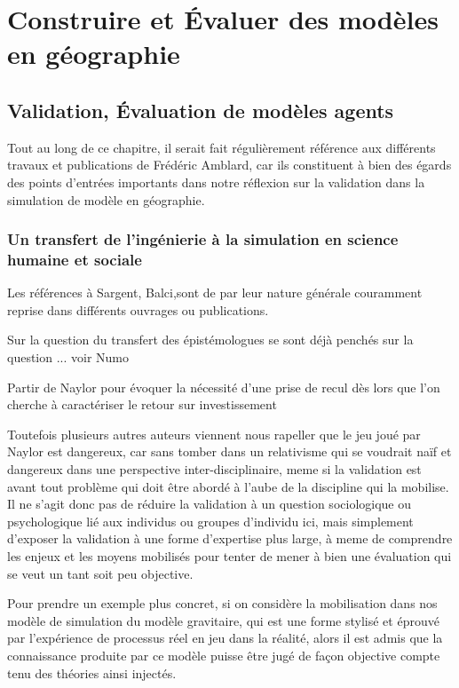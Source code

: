
\graphicspath{{Figure1/}}

\chapter{Construire et Évaluer des modèles en géographie}

\startcontents[chapters]
\Mprintcontents

\section {Validation, Évaluation de modèles agents} 

Tout au long de ce chapitre, il serait fait régulièrement référence aux différents travaux et publications de Frédéric Amblard, car ils constituent à bien des égards des points d'entrées importants dans notre réflexion sur la validation dans la simulation de modèle en géographie.

\subsection{Un transfert de l'ingénierie à la simulation en science humaine et sociale}

Les références à Sargent, Balci,sont de par leur nature générale couramment reprise dans différents ouvrages ou publications.

Sur la question du transfert des épistémologues se sont déjà penchés sur la question ... voir Numo

Partir de Naylor pour évoquer la nécessité d'une prise de recul dès lors que l'on cherche à caractériser le retour sur investissement

Toutefois plusieurs autres auteurs viennent nous rapeller que le jeu joué par Naylor est dangereux, car sans tomber dans un relativisme qui se voudrait naïf et dangereux dans une perspective inter-disciplinaire, meme si la validation est avant tout problème qui doit être abordé à l'aube de la discipline qui la mobilise. Il ne s'agit donc pas de réduire la validation à un question sociologique ou psychologique lié aux individus ou groupes d'individu ici, mais simplement d'exposer la validation à une forme d'expertise plus large, à meme de comprendre les enjeux et les moyens mobilisés pour tenter de mener à bien une évaluation qui se veut un tant soit peu objective.

Pour prendre un exemple plus concret, si on considère la mobilisation dans nos modèle de simulation du  modèle gravitaire, qui est une forme stylisé et éprouvé par l'expérience de processus réel en jeu dans la réalité, alors il est admis que la connaissance produite par ce modèle puisse être jugé de façon objective compte tenu des théories ainsi injectés.


